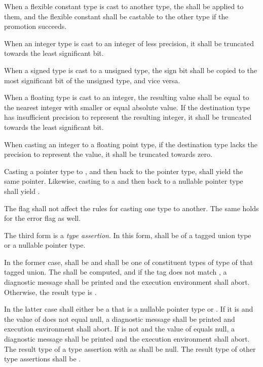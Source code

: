 \specsubsubitem
When a flexible constant type is cast to another type, the
 shall be applied to them, and
the flexible constant shall be castable to the other type if the promotion
succeeds.

\specsubsubitem
When an integer type is cast to an integer of less precision, it shall be
truncated towards the least significant bit.

\specsubsubitem
When a signed type is cast to a unsigned type, the sign bit shall be copied to
the most significant bit of the unsigned type, and vice versa.

\specsubsubitem
When a floating type is cast to an integer, the resulting value shall be equal
to the nearest integer with smaller or equal absolute value. If the destination
type has insufficient precision to represent the resulting integer, it shall be
truncated towards the least significant bit.

\specsubsubitem
When casting an integer to a floating point type, if the destination type
lacks the precision to represent the value, it shall be truncated towards zero.

\specsubsubitem
Casting a pointer type to , and then back to the pointer
type, shall yield the same pointer. Likewise, casting  to a
 and then back to a nullable pointer type shall yield
.


\specsubsubitem
The  flag shall not affect the rules for casting one type to
another. The same holds for the error flag as well.

\specsubsubitem
The third form is a \textit{type assertion}. In this form,
 shall be of a tagged union type or a nullable
pointer type.

In the former case,  shall be 
and shall be one of constituent types of type of that tagged union. The
 shall be computed, and if the tag does not match
, a diagnostic message shall be printed and the execution
environment shall abort. Otherwise, the result type is .

In the latter case  shall either be a
 that is a nullable pointer type or . If it is
 and the value of  does not equal
null, a diagnostic message shall be printed and execution environment shall
abort. If  is not  and the value
of  equals null, a diagnostic message shall be
printed and the execution environment shall abort. The result type of a type
assertion with  as  shall be null.
The result type of other type assertions shall be .

